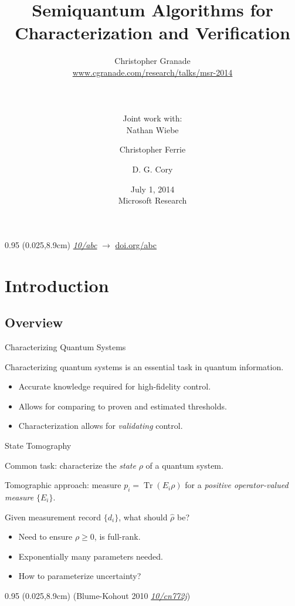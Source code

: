 \documentclass[xcolor=dvipsnames, compress]{beamer}
\title{Semiquantum Algorithms for Characterization and Verification}
\author[Granade, Wiebe, Ferrie and Cory]{
  Christopher Granade  \\
  {\tiny \url{www.cgranade.com/research/talks/msr-2014}} \\
  \rule{0.35\textwidth}{0.125pt}\\
  {\footnotesize Joint work with:}\\
  Nathan Wiebe \and
  Christopher Ferrie \and
  D. G. Cory
}
\institute[IQC]{
  Institute for Quantum Computing\\
  University of Waterloo, Ontario, Canada
}
\date[July 2014]{
  July 1, 2014 \\
  {\footnotesize Microsoft Research}
}
\renewcommand\UrlFont{\color{red}\rmfamily\itshape}
\newcommand{\shortdoi}[1]{\href{http://doi.org/#1}{\UrlFont 10/#1}}
\newcommand{\Tr}{\operatorname{Tr}}
\newcommand{\bottomnote}[1]{
  \begin{textblock*}{0.95\paperwidth} (0.025\paperwidth,8.9cm)
    {\tiny \hfill #1}
  \end{textblock*}
}
\begin{document}
\begin{frame}[plain]
  \titlepage
  \bottomnote{\shortdoi{abc} $\to$ \url{doi.org/abc}} 
\end{frame}

\section{Introduction}
\subsection{Overview}

\begin{frame}{Characterizing Quantum Systems}

  Characterizing quantum systems is an essential task in quantum information.

  \begin{itemize}
    \item Accurate knowledge required for high-fidelity control.
    \item Allows for comparing to proven and estimated thresholds.
    \item Characterization allows for \emph{validating} control.
  \end{itemize}

\end{frame}

\begin{frame}{State Tomography}

  Common task: characterize the \emph{state} $\rho$ of a quantum system.

  Tomographic approach: measure $p_i = \Tr(E_i\rho)$ for a \emph{positive operator-valued measure}
  $\{E_i\}$.


  Given measurement record $\{d_i\}$, what should $\hat{\rho}$ be?

  \begin{itemize}
    \item Need to ensure $\rho \ge 0$, is full-rank.
    \item Exponentially many parameters needed.
    \item How to parameterize uncertainty?
  \end{itemize}

  \bottomnote{(Blume-Kohout 2010 \shortdoi{cn772j})}

\end{frame}
\end{document}
